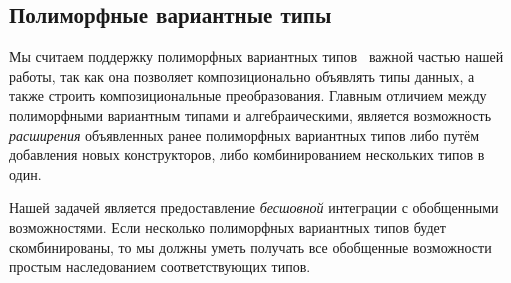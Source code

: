%
%
%
%
%




\subsection{Полиморфные вариантные типы}
\label{pv}

Мы считаем поддержку полиморфных вариантных типов~\cite{PolyVar,PolyVarReuse} важной частью нашей работы, так как она позволяет 
композиционально объявлять типы данных, а также строить композициональные преобразования.
Главным отличием между полиморфными вариантным типами и алгебраическими, является возможность
\emph{расширения} объявленных ранее полиморфных вариантных типов либо путём добавления новых конструкторов, либо комбинированием нескольких типов в один.

Нашей задачей является предоставление  \emph{бесшовной} интеграции с обобщенными возможностями. Если несколько полиморфных вариантных типов будет скомбинированы, то мы должны уметь получать все обобщенные возможности простым наследованием соответствующих типов.

